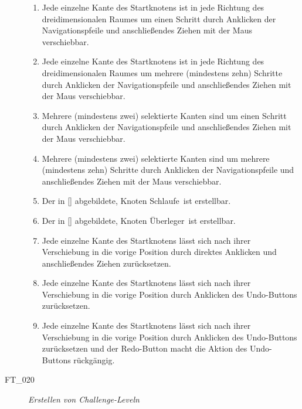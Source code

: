 \begin{description}
\begin{enumerate}
		\item Jede einzelne Kante des Startknotens ist in jede Richtung des dreidimensionalen Raumes um einen Schritt durch Anklicken der Navigationspfeile und anschließendes Ziehen mit der Maus verschiebbar.
		\item Jede einzelne Kante des Startknotens ist in jede Richtung des dreidimensionalen Raumes um mehrere (mindestens zehn) Schritte durch Anklicken der Navigationspfeile und anschließendes Ziehen mit der Maus verschiebbar.
		\item Mehrere (mindestens zwei) selektierte Kanten sind um einen Schritt durch Anklicken der Navigationspfeile und anschließendes Ziehen mit der Maus verschiebbar.
		\item Mehrere (mindestens zwei) selektierte Kanten sind um mehrere (mindestens zehn) Schritte durch Anklicken der Navigationspfeile und anschließendes Ziehen mit der Maus verschiebbar.
		
		\item Der in \ref{} abgebildete, Knoten \glqq Schlaufe\grqq~ist erstellbar.
		\item Der in \ref{} abgebildete, Knoten \glqq Überleger\grqq~ist erstellbar.
		
		\item Jede einzelne Kante des Startknotens lässt sich nach ihrer Verschiebung in die vorige Position durch direktes Anklicken und anschließendes Ziehen zurücksetzen.
		\item Jede einzelne Kante des Startknotens lässt sich nach ihrer Verschiebung in die vorige Position durch Anklicken des \glqq Undo\grqq-Buttons zurücksetzen.
		\item Jede einzelne Kante des Startknotens lässt sich nach ihrer Verschiebung in die vorige Position durch Anklicken des \glqq Undo\grqq-Buttons zurücksetzen und der \glqq Redo\grqq-Button macht die Aktion des \glqq Undo\grqq-Buttons rückgängig.
		~\\
	
	\end{enumerate}
	
	
	\item[FT\_020] \textit{Erstellen von Challenge-Leveln} \hfill\\
	
	\label{FT:20}
	
	\begin{enumerate} %
	

\end{enumerate}
\end{description}
